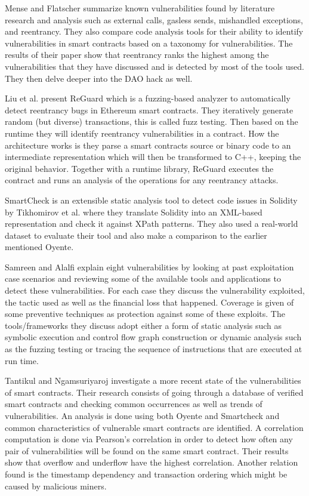 \documentclass[10pt,conference]{IEEEtran}
\begin{document}
Mense and Flatscher \cite{security} summarize known vulnerabilities found by literature research and analysis such as external calls, gasless sends, mishandled exceptions, and reentrancy. They also compare code analysis tools for their ability to identify vulnerabilities in smart contracts based on a taxonomy for vulnerabilities. The results of their paper show that reentrancy ranks the highest among the vulnerabilities that they have discussed and is detected by most of the tools used. They then delve deeper into the DAO hack as well.


Liu et al. \cite{reguard} present ReGuard which is a fuzzing-based analyzer to automatically detect reentrancy bugs in Ethereum smart contracts. They iteratively generate random (but diverse) transactions, this is called fuzz testing. Then based on the runtime they will identify reentrancy vulnerabilities in a contract. How the architecture works is they parse a smart contracts source or binary code to an intermediate representation which will then be transformed to C++, keeping the original behavior. Together with a runtime library, ReGuard executes the contract and runs an analysis of the operations for any reentrancy attacks.


SmartCheck is an extensible static analysis tool to detect code issues in Solidity by Tikhomirov et al.\cite{smartcheck} where they translate Solidity into an XML-based representation and check it against XPath patterns. They also used a real-world dataset to evaluate their tool and also make a comparison to the earlier mentioned Oyente.


Samreen and Alalfi \cite{survey} explain eight vulnerabilities by looking at past exploitation case scenarios and reviewing some of the available tools and applications to detect these vulnerabilities. For each case they discuss the vulnerability exploited, the tactic used as well as the financial loss that happened. Coverage is given of some preventive techniques as protection against some of these exploits. The tools/frameworks they discuss adopt either a form of static analysis such as symbolic execution and control flow graph construction or dynamic analysis such as the fuzzing testing or tracing the sequence of instructions that are executed at run time.

Tantikul and Ngamsuriyaroj \cite{icissp20} investigate a more recent state of the vulnerabilities of smart contracts. Their research consists of going through a database of verified smart contracts and checking common occurrences as well as trends of vulnerabilities. An analysis is done using both Oyente and Smartcheck and common characteristics of vulnerable smart contracts are identified. A correlation computation is done via Pearson's correlation in order to detect how often any pair of vulnerabilities will be found on the same smart contract. Their results show that overflow and underflow have the highest correlation. Another relation found is the timestamp dependency and transaction ordering which might be caused by malicious miners.  
\end{document}

